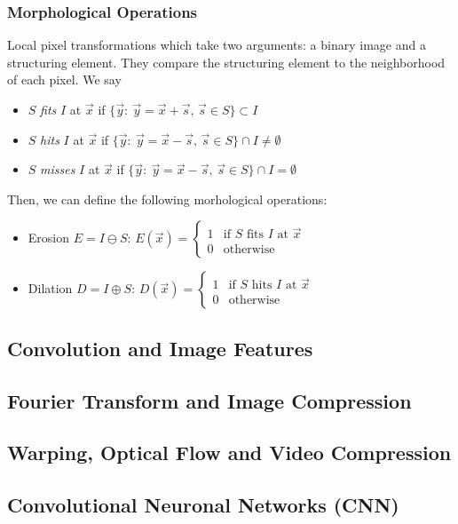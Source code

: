 \documentclass[a4paper,10pt]{article}
\begin{document}
\subsubsection{Morphological Operations}
Local pixel transformations which take two arguments: a binary image and a structuring element. They compare the structuring element to the neighborhood of each pixel. We say
\begin{itemize}
    \item \(S\) \emph{fits} \(I\) at \(\vec{x}\) if \(\{\vec{y}:\: \vec{y} = \vec{x} + \vec{s},\, \vec{s} \in S\} \subset I\)
    \item \(S\) \emph{hits} \(I\) at \(\vec{x}\) if \(\{\vec{y}:\: \vec{y} = \vec{x} - \vec{s},\, \vec{s} \in S\} \cap I \neq \emptyset\)
    \item \(S\) \emph{misses} \(I\) at \(\vec{x}\) if \(\{\vec{y}:\: \vec{y} = \vec{x} - \vec{s},\, \vec{s} \in S\} \cap I = \emptyset\)
\end{itemize}
Then, we can define the following morhological operations:
\begin{itemize}
    \item Erosion \(E = I \ominus S\): \(E(\vec{x}) = \begin{cases}
        1 & \text{if } S \text{ fits } I \text{ at } \vec{x}\\
        0 & \text{otherwise}
    \end{cases}\)
    \item Dilation \(D = I \oplus S\): \(D(\vec{x}) = \begin{cases}
        1 & \text{if } S \text{ hits } I \text{ at } \vec{x}\\
        0 & \text{otherwise}
    \end{cases}\)
\end{itemize}

\subsection{Convolution and Image Features}
\subsection{Fourier Transform and Image Compression}
\subsection{Warping, Optical Flow and Video Compression}
\subsection{Convolutional Neuronal Networks (CNN)}
\end{document}
